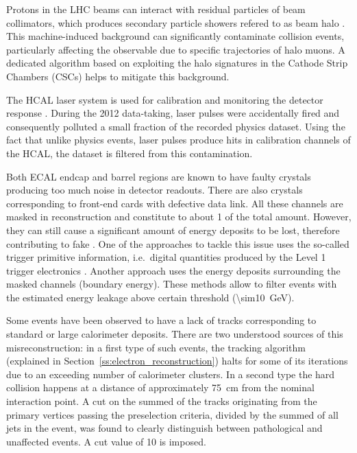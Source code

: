 \begin{description}[wide=\parindent]
	\item[CSC beam halo filter.]
	Protons in the LHC beams can interact with residual particles of beam collimators, which produces secondary particle
	showers refered to as beam halo \autocite{beam_halo_CMS}. This machine-induced background can significantly
	contaminate collision events, particularly affecting the \MET observable due to specific trajectories of halo muons.
	A dedicated algorithm based on exploiting the halo signatures in the Cathode Strip Chambers (CSCs) helps to mitigate
	this background.

	\item[HCAL laser filter.] The HCAL laser system is used for calibration and monitoring the detector response
	\autocite{CMS_TDR1}. During the 2012 data-taking, laser pulses were accidentally fired and consequently polluted a
	small fraction of the recorded physics dataset. Using the fact that unlike physics events, laser pulses produce hits
	in calibration channels of the HCAL, the dataset is filtered from this contamination.

	\item[ECAL dead cell filter.] Both ECAL endcap and barrel regions are known to have faulty crystals producing too
	much noise in detector readouts. There are also crystals corresponding to front-end cards with defective data link.
	All these channels are masked in reconstruction and constitute to about \SI{1}{\pc} of the total amount. However,
	they can still cause a significant amount of energy deposits to be lost, therefore contributing to fake \MET. One of
	the approaches to tackle this issue uses the so-called trigger primitive information, i.e.\ digital quantities
	produced by the Level 1 trigger electronics \autocite{CMS_L1_Trigger_TDR}. Another approach uses the energy deposits
	surrounding the masked channels (boundary energy). These methods allow to filter events with the estimated energy
	leakage above certain threshold (\SI{\sim10}{\GeV}).

	\item[Tracking failure filter.] Some events have been observed to have a lack of tracks corresponding to standard or
	large calorimeter deposits. There are two understood sources of this misreconstruction: in a first type of such
	events, the tracking algorithm (explained in Section~\ref{ss:electron_reconstruction}) halts for some of its
	iterations due to an exceeding number of calorimeter clusters. In a second type the hard collision happens at a
	distance of approximately \SI{75}{\cm} from the nominal interaction point. A cut on the summed \pt of the tracks
	originating from the primary vertices passing the preselection criteria, divided by the summed \pt of all jets in
	the event, was found to clearly distinguish between pathological and unaffected events. A cut value of \SI{10}{\pc}
	is imposed.


\end{description}
